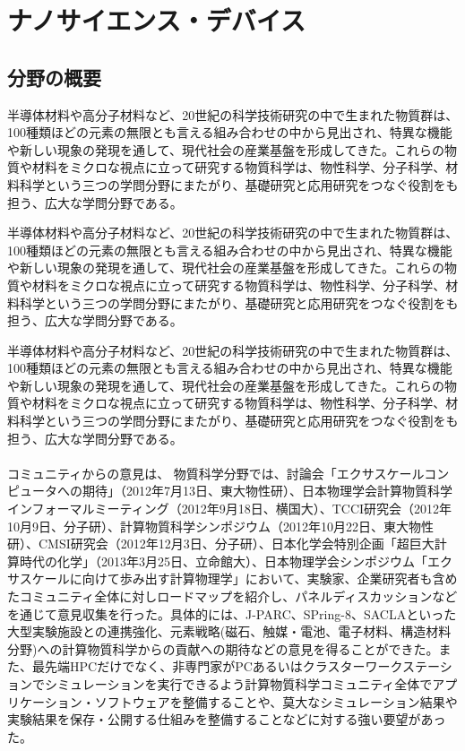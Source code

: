 \section{ナノサイエンス・デバイス}
\label{sec:ナノデバイス}

\subsection{分野の概要}
半導体材料や高分子材料など、20世紀の科学技術研究の中で生まれた物質群は、100種類ほどの元素の無限とも言える組み合わせの中から見出され、特異な機能や新しい現象の発現を通して、現代社会の産業基盤を形成してきた。これらの物質や材料をミクロな視点に立って研究する物質科学は、物性科学、分子科学、材料科学という三つの学問分野にまたがり、基礎研究と応用研究をつなぐ役割をも担う、広大な学問分野である。

半導体材料や高分子材料など、20世紀の科学技術研究の中で生まれた物質群は、100種類ほどの元素の無限とも言える組み合わせの中から見出され、特異な機能や新しい現象の発現を通して、現代社会の産業基盤を形成してきた。これらの物質や材料をミクロな視点に立って研究する物質科学は、物性科学、分子科学、材料科学という三つの学問分野にまたがり、基礎研究と応用研究をつなぐ役割をも担う、広大な学問分野である。

半導体材料や高分子材料など、20世紀の科学技術研究の中で生まれた物質群は、100種類ほどの元素の無限とも言える組み合わせの中から見出され、特異な機能や新しい現象の発現を通して、現代社会の産業基盤を形成してきた。これらの物質や材料をミクロな視点に立って研究する物質科学は、物性科学、分子科学、材料科学という三つの学問分野にまたがり、基礎研究と応用研究をつなぐ役割をも担う、広大な学問分野である。

\paragraph{}
コミュニティからの意見は、
物質科学分野では、討論会「エクサスケールコンピュータへの期待」（2012年7月13日、東大物性研）、日本物理学会計算物質科学インフォーマルミーティング（2012年9月18日、横国大）、TCCI研究会（2012年10月9日、分子研）、計算物質科学シンポジウム（2012年10月22日、東大物性研）、CMSI研究会（2012年12月3日、分子研）、日本化学会特別企画「超巨大計算時代の化学」（2013年3月25日、立命館大）、日本物理学会シンポジウム「エクサスケールに向けて歩み出す計算物理学」において、実験家、企業研究者も含めたコミュニティ全体に対しロードマップを紹介し、パネルディスカッションなどを通じて意見収集を行った。具体的には、J-PARC、SPring-8、SACLAといった大型実験施設との連携強化、元素戦略(磁石、触媒・電池、電子材料、構造材料分野)への計算物質科学からの貢献への期待などの意見を得ることができた。また、最先端HPCだけでなく、非専門家がPCあるいはクラスターワークステーションでシミュレーションを実行できるよう計算物質科学コミュニティ全体でアプリケーション・ソフトウェアを整備することや、莫大なシミュレーション結果や実験結果を保存・公開する仕組みを整備することなどに対する強い要望があった。

